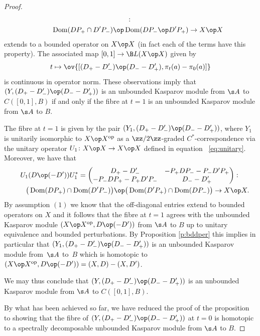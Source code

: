 \begin{proof}
\begin{gather*}
 [ (D_+ - D_-') \op (D_- - D_+') , \pi_t(a) - \pi_0(a) ]
 \colon \\
 \qquad{} \operatorname{Dom}(DP_+ \cap D'P_-) \op \operatorname{Dom}(D P_- \op D'P_+) \to X \op X
\end{gather*}
extends to a bounded operator on $X \op X$ (in fact each of the terms have this property). The associated map $[0,1] \to \B L(X \op X)$ given by
\[
t \mapsto \ov{ [ (D_+ - D_-') \op (D_- - D_+') , \pi_t(a) - \pi_0(a) ] }
\]
is continuous in operator norm. These observations imply that $(Y, (D_+ - D_-') \op (D_- - D_+'))$ is an unbounded Kasparov module from $\s A$ to $C( [0,1],B)$ if and only if the fibre at $t = 1$ is an unbounded Kasparov module from $\s A$ to $B$.

The fibre at $t = 1$ is given by the pair $( Y_1, (D_+ - D_-') \op (D_- - D_+') )$, where $Y_1$ is unitarily isomorphic to $X \op X^{{\rm op}}$ as a $\zz/2\zz$-graded $C^*$-correspondence via the unitary operator $U_1\colon X \op X \to X \op X$ defined in equation~ \eqref{eq:unitary}. Moreover, we have that
\begin{gather*}
 U_1 ( D \op (- D') ) U_1^*
= \left(\begin{matrix} D_+ - D'_- & - P_+ D P_- - P_- D' P_+ \\ - P_- D P_+ - P_+ D' P_- & D_- - D'_+\end{matrix}\right)\colon \nonumber\\
\qquad{} \big( \operatorname{Dom}( DP_+) \cap \operatorname{Dom}( D' P_-) \big) \op \big( \operatorname{Dom}( D'P_+) \cap \operatorname{Dom}( D P_-) \big)%
\to X \op X .
\end{gather*}
By assumption $(1)$ we know that the off-diagonal entries extend to bounded operators on $X$ and it follows that the fibre at $t = 1$ agrees with the unbounded Kasparov module $(X \op X^{{\rm op}}, D \op (- D') )$ from $\s A$ to $B$ up to unitary equivalence and bounded perturbations. By Proposition \ref{p:bddper} this implies in particular that $(Y_1, (D_+ - D_-') \op (D_- - D_+'))$ is an unbounded Kasparov module from~$\s A$ to~$B$ which is homotopic to $(X \op X^{{\rm op}}, D \op (- D')) = (X,D) - (X, D')$.

We may thus conclude that $(Y,(D_+ - D_-') \op (D_- - D_+'))$ is an unbounded Kasparov module from $\s A$ to $C( [0,1],B)$.

By what has been achieved so far, we have reduced the proof of the proposition to showing that the fibre of $(Y, (D_+ - D_-') \op (D_- - D_+'))$ at $t = 0$ is homotopic to a spectrally decomposable unbounded Kasparov module from $\s A$ to $B$.


\end{proof}
